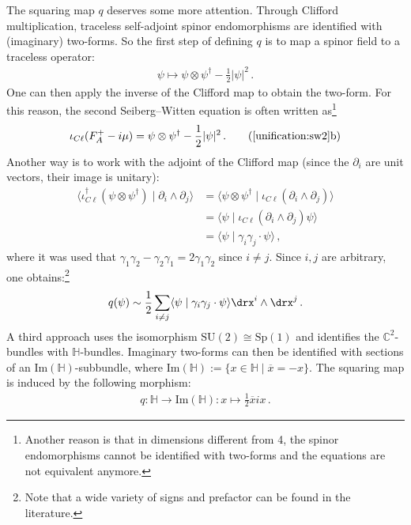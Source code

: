     \begin{construct}
        The squaring map $q$ deserves some more attention. Through Clifford multiplication, traceless self-adjoint spinor endomorphisms are identified with (imaginary) two-forms. So the first step of defining $q$ is to map a spinor field to a traceless operator:
        \begin{gather}
            \psi\mapsto\psi\otimes\psi^\dagger - \frac{1}{2}|\psi|^2\,.
        \end{gather}
        One can then apply the inverse of the Clifford map to obtain the two-form. For this reason, the second Seiberg--Witten equation is often written as\footnote{Another reason is that in dimensions different from 4, the spinor endomorphisms cannot be identified with two-forms and the equations are not equivalent anymore.}
        \begin{gather}
            \iota_{C\ell}(F_A^+-i\mu) = \psi\otimes\psi^\dagger-\frac{1}{2}|\psi|^2\,.
            \tag{\ref*{unification:sw2}b}
        \end{gather}
        Another way is to work with the adjoint of the Clifford map (since the $\partial_i$ are unit vectors, their image is unitary):
        \begin{align*}
            \langle\iota_{C\ell}^\dagger(\psi\otimes\psi^\dagger)\mid\partial_i\wedge\partial_j\rangle &= \langle\psi\otimes\psi^\dagger\mid\iota_{C\ell}(\partial_i\wedge\partial_j)\rangle\\
            &= \langle\psi\mid\iota_{C\ell}(\partial_i\wedge\partial_j)\psi\rangle\\
            &= \langle\psi\mid\gamma_i\gamma_j\cdot\psi\rangle\,,
        \end{align*}
        where it was used that $\gamma_1\gamma_2-\gamma_2\gamma_1=2\gamma_1\gamma_2$ since $i\neq j$. Since $i,j$ are arbitrary, one obtains:\footnote{Note that a wide variety of signs and prefactor can be found in the literature.}
        \begin{gather}
            q(\psi)\sim\frac{1}{2}\sum_{i\neq j}\langle\psi\mid\gamma_i\gamma_j\cdot\psi\rangle\drx^i\wedge\drx^j\,.
        \end{gather}
        A third approach uses the isomorphism $\mathrm{SU}(2)\cong\mathrm{Sp}(1)$ and identifies the $\mathbb{C}^2$-bundles with $\mathbb{H}$-bundles. Imaginary two-forms can then be identified with sections of an $\mathrm{Im}(\mathbb{H})$-subbundle, where $\mathrm{Im}(\mathbb{H}):=\{x\in\mathbb{H}\mid\overline{x}=-x\}$. The squaring map is induced by the following morphism:
        \begin{gather}
            q:\mathbb{H}\rightarrow\mathrm{Im}(\mathbb{H}):x\mapsto\frac{1}{2}\overline{x}ix\,.
        \end{gather}
    \end{construct}

